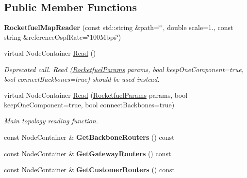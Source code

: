 \subsection*{Public Member Functions}
\begin{DoxyCompactItemize}
\item 
{\bfseries Rocketfuel\+Map\+Reader} (const std\+::string \&path=\char`\"{}\char`\"{}, double scale=1., const string \&reference\+Ospf\+Rate=\char`\"{}100\+Mbps\char`\"{})\hypertarget{classns3_1_1RocketfuelMapReader_a4d2975fb92258c622d77d7a67ffd8361}{}\label{classns3_1_1RocketfuelMapReader_a4d2975fb92258c622d77d7a67ffd8361}

\item 
virtual Node\+Container \hyperlink{classns3_1_1RocketfuelMapReader_a6b5274a161c28648d5c0c8899f51d269}{Read} ()\hypertarget{classns3_1_1RocketfuelMapReader_a6b5274a161c28648d5c0c8899f51d269}{}\label{classns3_1_1RocketfuelMapReader_a6b5274a161c28648d5c0c8899f51d269}

\begin{DoxyCompactList}\small\item\em Deprecated call. Read (\hyperlink{structns3_1_1RocketfuelParams}{Rocketfuel\+Params} params, bool keep\+One\+Component=true, bool connect\+Backbones=true) should be used instead. \end{DoxyCompactList}\item 
virtual Node\+Container \hyperlink{classns3_1_1RocketfuelMapReader_ac5d206292333d41e01f587ec703363fb}{Read} (\hyperlink{structns3_1_1RocketfuelParams}{Rocketfuel\+Params} params, bool keep\+One\+Component=true, bool connect\+Backbones=true)
\begin{DoxyCompactList}\small\item\em Main topology reading function. \end{DoxyCompactList}\item 
const Node\+Container \& {\bfseries Get\+Backbone\+Routers} () const\hypertarget{classns3_1_1RocketfuelMapReader_a6aac72ede12edb244888b7bd11375bd3}{}\label{classns3_1_1RocketfuelMapReader_a6aac72ede12edb244888b7bd11375bd3}

\item 
const Node\+Container \& {\bfseries Get\+Gateway\+Routers} () const\hypertarget{classns3_1_1RocketfuelMapReader_a26ccdba5f5d7c14e12468471627386bf}{}\label{classns3_1_1RocketfuelMapReader_a26ccdba5f5d7c14e12468471627386bf}

\item 
const Node\+Container \& {\bfseries Get\+Customer\+Routers} () const\hypertarget{classns3_1_1RocketfuelMapReader_a8a7be835d59d81506a8d469f2d9a1ae2}{}\label{classns3_1_1RocketfuelMapReader_a8a7be835d59d81506a8d469f2d9a1ae2}


\end{DoxyCompactItemize}
